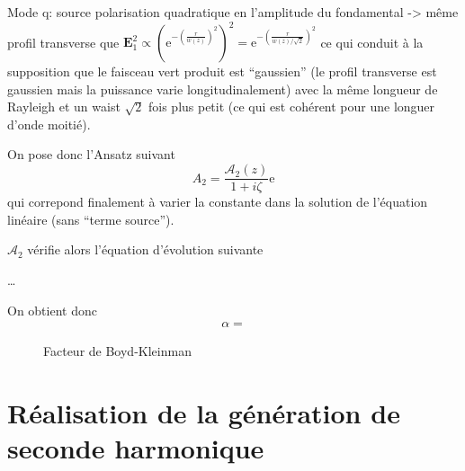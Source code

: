 \documentclass[11pt,a4paper] { article}
\newcommand{\e}[1]{\text{e}^{#1}}
\renewcommand{\v}[1]{\mathbf{#1}}
\begin{document}
Mode q: source polarisation quadratique en l'amplitude du fondamental -> même profil transverse que $\v E_1^2 \propto \left( \e{-\left(\frac{r}{w(z)}\right)^2} \right)^2 = \e{-\left(\frac{r}{w(z)/ \sqrt 2}\right)^2}$ ce qui conduit à la supposition que le faisceau vert produit est ``gaussien'' (le profil transverse est gaussien mais la puissance varie longitudinalement) avec la même longueur de Rayleigh et un waist $\sqrt 2$ fois plus petit (ce qui est cohérent pour une longuer d'onde moitié).

On pose donc l'Ansatz suivant \[ A_2 = \frac{\mathcal A_2(z)}{1+i\zeta}\e{} \] qui correpond finalement à varier la constante dans la solution de l'équation linéaire (sans ``terme source'').

$\mathcal A_2$ vérifie alors l'équation d'évolution suivante

\dots

On obtient donc 
\begin{align}
	\alpha = 	
\end{align}

\begin{figure}[htpb] 
\centering
\hspace*{-0.8cm}
\begin{subfigure}[b]{0.48\textwidth}
	\small
	
\end{subfigure}
\hspace{0.2cm}
\begin{subfigure}[b]{0.48\textwidth}
	\small
	
\end{subfigure}
\hspace{0.8cm}
\caption{Facteur de Boyd-Kleinman}
\label{fig:bk-factor}
\end{figure}


\section{Réalisation de la génération de seconde harmonique}
\end{document}

